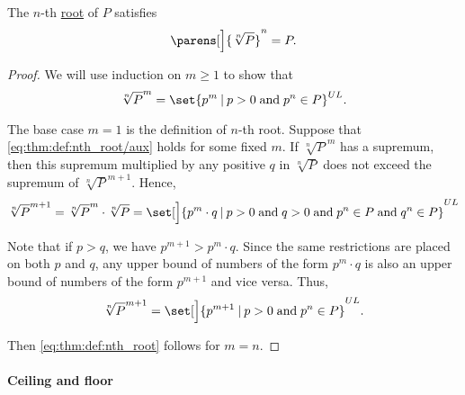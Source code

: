 \begin{proposition}\label{thm:power_of_nth_root}
  The \( n \)-th \hyperref[def:nth_root]{root} of \( P \) satisfies
  \begin{equation}\label{eq:thm:def:nth_root}
    \parens[\Big]{ \sqrt[n]{ P } }^n = P.
  \end{equation}
\end{proposition}
\begin{proof}
  We will use induction on \( m \geq 1 \) to show that
  \begin{equation}\label{eq:thm:def:nth_root/aux}
    \sqrt[n]{ P }^m = \set{ p^m \given p > 0 \T{and} p^n \in P }^{UL}.
  \end{equation}

  The base case \( m = 1 \) is the definition of \( n \)-th root. Suppose that \eqref{eq:thm:def:nth_root/aux} holds for some fixed \( m \). If \( \sqrt[n]{ P }^m \) has a supremum, then this supremum multiplied by any positive \( q \) in \( \sqrt[n]{ P } \) does not exceed the supremum of \( \sqrt[n]{ P }^{m+1} \). Hence,
  \begin{equation*}
    \sqrt[n]{ P }^{m+1} = \sqrt[n]{ P }^m \cdot \sqrt[n]{ P } = \set[\Big]{ p^m \cdot q \given p > 0 \T{and} q > 0 \T{and} p^n \in P \T{and} q^n \in P }^{UL}
  \end{equation*}

  Note that if \( p > q \), we have \( p^{m+1} > p^m \cdot q \). Since the same restrictions are placed on both \( p \) and \( q \), any upper bound of numbers of the form \( p^m \cdot q \) is also an upper bound of numbers of the form \( p^{m+1} \) and vice versa. Thus,
  \begin{equation*}
    \sqrt[n]{ P }^{m+1}
    =
    \set[\Big]{ p^{m+1} \given p > 0 \T{and} p^n \in P }^{UL}.
  \end{equation*}

  Then \eqref{eq:thm:def:nth_root} follows for \( m = n \).
\end{proof}

\paragraph{Ceiling and floor}

